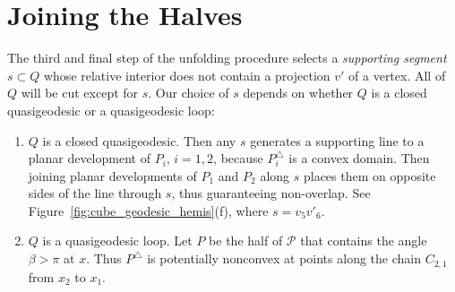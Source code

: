 \pdfoutput=1  \documentclass[]{article}
\newcommand{\hide}[1]{}
\newcommand{\figref}[1]{\ref{fig:#1}}
\def\P{{\mathcal P}}
\def\b{{\beta}}
\newcommand{\squeezelist}{\setlength{\itemsep}{0pt}}
\begin{document}
\section{Joining the Halves}
The third and final step of the unfolding procedure
selects a \emph{supporting segment} $s \subset Q$
whose relative interior does not contain
a projection $v'$ of a vertex.
All of $Q$ will be cut except for $s$.
Our choice of $s$ depends on whether $Q$ is a closed quasigeodesic
or a quasigeodesic loop:
\begin{enumerate}
\squeezelist
\item $Q$ is a closed quasigeodesic.
Then any $s$ generates a supporting line to a planar development of $P_i$,
$i=1,2$,
because $P_i^\triangle$ is a convex domain.
Then joining planar developments of $P_1$ and $P_2$ along $s$
places them on opposite sides of the line through $s$,
thus guaranteeing non-overlap.
See Figure~\figref{cube_geodesic_hemis}(f),
where $s=v_5 v'_6$.
\item $Q$ is a quasigeodesic loop.
Let $P$ be the half of $\P$ that contains the angle $\b > \pi$ at $x$.
Thus $P^\triangle$ is potentially nonconvex at
points along the chain $C_{2,1}$ from $x_2$ to $x_1$.
\hide{
Nevertheless, some $s$ might still be a supporting line of
$P_1$.
This is the case in Figure~\figref{GeodesicLoopCube}, where several
supporting $s$ options exist.

Although we do not have an example where no such supporting
$s$ exists, neither do we have a method to guarantee that one
does exist.
So we follow a different strategy.

}
\end{enumerate}
\end{document}
